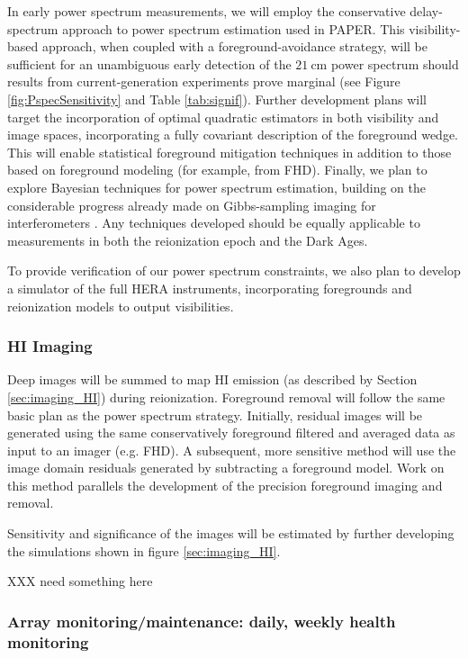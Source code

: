 \documentclass[preprint]{aastex}
\begin{document}
In early power spectrum measurements, we will employ the conservative delay-spectrum approach to power spectrum estimation used in PAPER.  This visibility-based approach, when coupled with a foreground-avoidance strategy, will be sufficient for an unambiguous early detection of the $21~\textrm{cm}$ power spectrum should results from current-generation experiments prove marginal (see Figure \ref{fig:PspecSensitivity} and Table \ref{tab:signif}).  Further development plans will target the incorporation of optimal quadratic estimators \citep{liu_tegmark2011,dillon_et_al2013a} in both visibility and image spaces, incorporating a fully covariant description of the foreground wedge.  This will enable statistical foreground mitigation techniques in addition to those based on foreground modeling (for example, from FHD).  Finally, we plan to explore Bayesian techniques for power spectrum estimation, building on the considerable progress already made on Gibbs-sampling imaging for interferometers \cite{sutter_et_al2014}.  Any techniques developed should be equally applicable to measurements in both the reionization epoch and the Dark Ages.

To provide verification of our power spectrum constraints, we also plan to develop a simulator of the full HERA instruments, incorporating foregrounds and reionization models to output visibilities.

\subsubsection{HI Imaging}
Deep images will be summed to map HI emission (as described by Section \ref{sec:imaging_HI}) during reionization.   Foreground removal will follow the same basic plan as the power spectrum strategy.  Initially, residual images will be generated using the same conservatively foreground filtered and averaged data as input to an imager (e.g. FHD).  A subsequent, more sensitive method will use the image domain residuals generated by subtracting a foreground model.  Work on this method parallels the development of the precision foreground imaging and removal.

Sensitivity and significance of the images will be estimated by further developing the simulations shown in figure \ref{sec:imaging_HI}.  

XXX need something here

\subsubsection{Array monitoring/maintenance: daily, weekly health monitoring}
\end{document}
